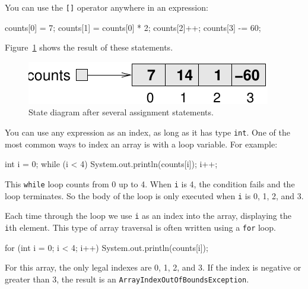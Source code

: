 \documentclass[12pt]{book}
\theoremstyle{exercise}
\newcommand{\java}[1]{\verb"#1"}
\begin{document}
You can use the \java{[]} operator anywhere in an expression:

\begin{code}
    counts[0] = 7;
    counts[1] = counts[0] * 2;
    counts[2]++;
    counts[3] -= 60;
\end{code}

Figure~\ref{fig.array2} shows the result of these statements.

\begin{figure}
\begin{center}
\includegraphics{figs/array2.pdf}
\caption{State diagram after several assignment statements.}
\label{fig.array2}
\end{center}
\end{figure}


You can use any expression as an index, as long as it has type \java{int}.
One of the most common ways to index an array is with a loop variable.
For example:

\begin{code}
    int i = 0;
    while (i < 4) {
        System.out.println(counts[i]);
        i++;
    }
\end{code}


This \java{while} loop counts from 0 up to 4.
When \java{i} is 4, the condition fails and the loop terminates.
So the body of the loop is only executed when \java{i} is 0, 1, 2, and 3.

Each time through the loop we use \java{i} as an index into the array, displaying the \java{i}th element.
This type of array traversal is often written using a \java{for} loop.

\begin{code}
    for (int i = 0; i < 4; i++) {
        System.out.println(counts[i]);
    }
\end{code}

For this array, the only legal indexes are 0, 1, 2, and 3.
If the index is negative or greater than 3, the result is an \java{ArrayIndexOutOfBoundsException}.

\end{document}
